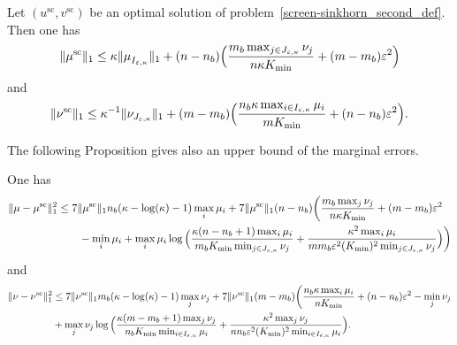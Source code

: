\begin{lemma}
\label{lemma_bounds_on_marginals}
Let $(u^{\text{sc}}, v^{\text{sc}})$ be an optimal solution of problem~\eqref{screen-sinkhorn_second_def}.
Then one has 
\begin{equation*}
\|\mu^{\text{sc}}\|_1 \leq \kappa \|\mu_{I_{\varepsilon,\kappa}}^{\text{}}\|_1 + (n-n_b) \Big(\frac{m_b\max_{j \in J_{\varepsilon,\kappa}} \nu_j}{n\kappa K_{\min}} + (m-m_b)\varepsilon^2 \Big)
\end{equation*}
and 
\begin{equation*}
\|\nu^{\text{sc}}\|_1 \leq \kappa^{-1} \|\nu_{J_{\varepsilon,\kappa}}\|_1 + (m-m_b)\Big(\frac{n_b\kappa \max_{i\in I_{\varepsilon,\kappa}}\mu_i}{m K_{\min}} + (n-n_b)\varepsilon^2\Big).
\end{equation*}
\end{lemma}
The following Proposition gives also an upper bound of the marginal errors.
\begin{proposition}
\label{proposition_error_in_marginals}
One has 
\begin{align*} %
{\norm{{\mu} -{\mu}^{\text{sc}}}^2_1}&\leq 7\norm{\mu^{\text{sc}}}_1 n_b(\kappa-\log(\kappa)-1)\max_{i} \mu_i + 7\norm{\mu^{\text{sc}}}_1  (n-n_b)\bigg(\frac{m_b\max_{j}\nu_j}{n\kappa K_{\min}} + (m- m_b) \varepsilon^2\\
&\qquad - \min_{i}\mu_i + \max_{i} \mu_i\log\Big(\frac{\kappa(n-n_b+ 1)\max_{i} \mu_i}{m_b K_{\min}\min_{j \in J_{\varepsilon,\kappa}}\nu_j} + \frac{\kappa^2\max_{i} \mu_i}{mm_b\varepsilon^2(K_{\min})^2\min_{j \in J_{\varepsilon,\kappa}}\nu_j}\Big)\bigg)%
\end{align*}
and 
\begin{align*} %
{\norm{{\nu} -{\nu}^{\text{sc}}}^2_1} &\leq 7\norm{\nu^{\text{sc}}}_1m_b(\kappa-\log(\kappa)-1)\max_{j} \nu_j + 7\norm{\nu^{\text{sc}}}_1(m-m_b)\bigg(\frac{n_b\kappa\max_{i}\mu_i}{n K_{\min}} + (n- n_b) \varepsilon^2 - \min_{j}\nu_j\\
&+ \max_{j} \nu_j\log\Big(\frac{\kappa(m-m_b+ 1)\max_{j} \nu_j}{n_b K_{\min}\min_{i \in I_{\varepsilon,\kappa}}\mu_i} + \frac{\kappa^2\max_{j} \nu_j}{nn_b\varepsilon^2(K_{\min})^2\min_{i \in I_{\varepsilon,\kappa}}\mu_i}\Big).%
\end{align*}

\end{proposition}

